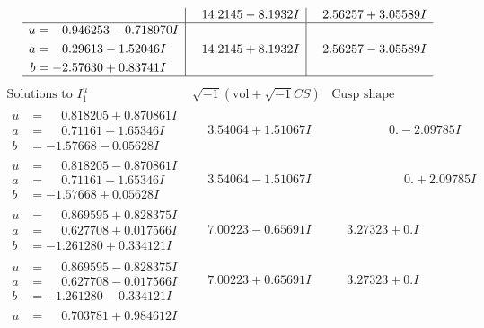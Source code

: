 \documentclass[1p]{elsarticle_modified}
\theoremstyle{definition}
\newcommand{\I}{\sqrt{-1}}
\begin{document}
$$\begin{array}{c|c|c}
 & \phantom{-}14.2145 - 8.1932 I & \phantom{-}2.56257 + 3.05589 I \\ \hline\begin{aligned}
u &= \phantom{-}0.946253 - 0.718970 I \\
a &= \phantom{-}0.29613 - 1.52046 I \\
b &= -2.57630 + 0.83741 I\end{aligned}
 & \phantom{-}14.2145 + 8.1932 I & \phantom{-}2.56257 - 3.05589 I\\
 \hline 
 \end{array}$$\newpage$$\begin{array}{c|c|c}  
\text{Solutions to }I^u_{1}& \I (\text{vol} + \sqrt{-1}CS) & \text{Cusp shape}\\
 \hline 
\begin{aligned}
u &= \phantom{-}0.818205 + 0.870861 I \\
a &= \phantom{-}0.71161 + 1.65346 I \\
b &= -1.57668 - 0.05628 I\end{aligned}
 & \phantom{-}3.54064 + 1.51067 I & \phantom{-0.000000 } 0. - 2.09785 I \\ \hline\begin{aligned}
u &= \phantom{-}0.818205 - 0.870861 I \\
a &= \phantom{-}0.71161 - 1.65346 I \\
b &= -1.57668 + 0.05628 I\end{aligned}
 & \phantom{-}3.54064 - 1.51067 I & \phantom{-0.000000 -}0. + 2.09785 I \\ \hline\begin{aligned}
u &= \phantom{-}0.869595 + 0.828375 I \\
a &= \phantom{-}0.627708 + 0.017566 I \\
b &= -1.261280 + 0.334121 I\end{aligned}
 & \phantom{-}7.00223 - 0.65691 I & \phantom{-}3.27323 + 0. I\phantom{ +0.000000I} \\ \hline\begin{aligned}
u &= \phantom{-}0.869595 - 0.828375 I \\
a &= \phantom{-}0.627708 - 0.017566 I \\
b &= -1.261280 - 0.334121 I\end{aligned}
 & \phantom{-}7.00223 + 0.65691 I & \phantom{-}3.27323 + 0. I\phantom{ +0.000000I} \\ \hline\begin{aligned}
u &= \phantom{-}0.703781 + 0.984612 I \\

\end{aligned}
\end{array}$$
\end{document}
